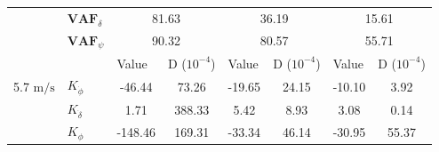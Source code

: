 \begin{table}[]
\begin{tabular}{llcccccc}
                                 & $\mathbf{VAF}_\delta$ & \multicolumn{2}{c}{81.63}                                                                       & \multicolumn{2}{c}{36.19}                                                                       & \multicolumn{2}{c}{15.61}                                                                       \\
                                 & $\mathbf{VAF}_\psi$   & \multicolumn{2}{c}{90.32}                                                                       & \multicolumn{2}{c}{80.57}                                                                       & \multicolumn{2}{c}{55.71}                                                                       \\ \hline
                                 &                       & \multicolumn{1}{l}{\multirow{2}{*}{Value}} & \multicolumn{1}{l}{\multirow{2}{*}{D ($10^{-4}$)}} & \multicolumn{1}{l}{\multirow{2}{*}{Value}} & \multicolumn{1}{l}{\multirow{2}{*}{D ($10^{-4}$)}} & \multicolumn{1}{l}{\multirow{2}{*}{Value}} & \multicolumn{1}{l}{\multirow{2}{*}{D ($10^{-4}$)}} \\
                                 &                       & \multicolumn{1}{l}{}                       & \multicolumn{1}{l}{}                               & \multicolumn{1}{l}{}                       & \multicolumn{1}{l}{}                               & \multicolumn{1}{l}{}                       & \multicolumn{1}{l}{}                               \\ \cline{3-8} 
    5.7 $\si{\meter\per\second}$ & $K_{\dot{\phi}} $     & -46.44                                     & 73.26                                              & -19.65                                     & 24.15                                              & -10.10                                     & 3.92                                               \\
                                 & $K_{\dot{\delta}}$    & 1.71                                       & 388.33                                             & 5.42                                       & 8.93                                               & 3.08                                       & 0.14                                               \\
                                 & $K_{\phi} $           & -148.46                                    & 169.31                                             & -33.34                                     & 46.14                                              & -30.95                                     & 55.37                                              \\

\end{tabular}
\end{table}
